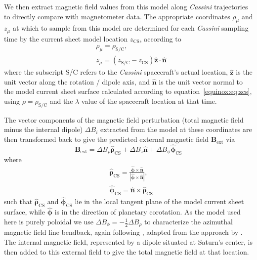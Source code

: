 We then extract magnetic field values from this model along \textit{Cassini} trajectories to directly compare with magnetometer data. The appropriate coordinates $\rho_\mu$ and $z_\mu$ at which to sample from this model are determined for each \textit{Cassini} sampling time by the current sheet model location $z_\mathrm{CS}$, according to
\begin{align}\label{equinox:eq:coordinatetransform}
& \rho_\mu = \rho_\mathrm{S/C},\nonumber\\
& z_\mu = (z_\mathrm{S/C} - z_\mathrm{CS})\hat{\boldsymbol{z}}\cdot\hat{\boldsymbol{n}}
\end{align}
where the subscript S/C refers to the \textit{Cassini} spacecraft's actual location, $\hat{\boldsymbol{z}}$ is the unit vector along the rotation / dipole axis, and $\hat{\boldsymbol{n}}$ is the unit vector normal to the model current sheet surface calculated according to equation~\ref{equinox:eq:zcs}, using $\rho = \rho_\mathrm{S/C}$ and the $\lambda$ value of the spacecraft location at that time.

The vector components of the magnetic field perturbation (total magnetic field minus the internal dipole) $\Delta B_i$ extracted from the model at these coordinates are then transformed back to give the predicted external magnetic field $\boldsymbol{B_\mathrm{ext}}$ via
\begin{equation}\label{equinox:eq:Bext}
\boldsymbol{B_\mathrm{ext}} = \Delta B_\rho \hat{\boldsymbol{\rho}}_\mathrm{CS} + \Delta B_z \hat{\boldsymbol{n}} + \Delta B_\phi \hat{\boldsymbol{\phi}}_\mathrm{CS}
\end{equation}
where
\begin{align}\label{equinox:eq:vectortransform}
& \hat{\boldsymbol{\rho}}_\mathrm{CS} = \frac{\hat{\boldsymbol{\phi}} \times \hat{\boldsymbol{n}}}{| \hat{\boldsymbol{\phi}} \times \hat{\boldsymbol{n}}|}, \nonumber\\
& \hat{\boldsymbol{\phi}}_\mathrm{CS} = \hat{\boldsymbol{n}} \times \hat{\boldsymbol{\rho}}_\mathrm{CS}
\end{align}
such that $\hat{\boldsymbol{\rho}}_\mathrm{CS}$ and $\hat{\boldsymbol{\phi}}_\mathrm{CS}$ lie in the local tangent plane of the model current sheet surface, while $\hat{\boldsymbol{\phi}}$ is in the direction of planetary corotation. As the model used here is purely poloidal we use $\Delta B_\phi = -\frac{1}{2} \Delta B_\rho$ to characterize the azimuthal magnetic field line bendback, again following \citet{achilleos2014}, adapted from the approach by \citet{arridge2011}. The internal magnetic field, represented by a dipole situated at Saturn's center, is then added to this external field to give the total magnetic field at that location. 

